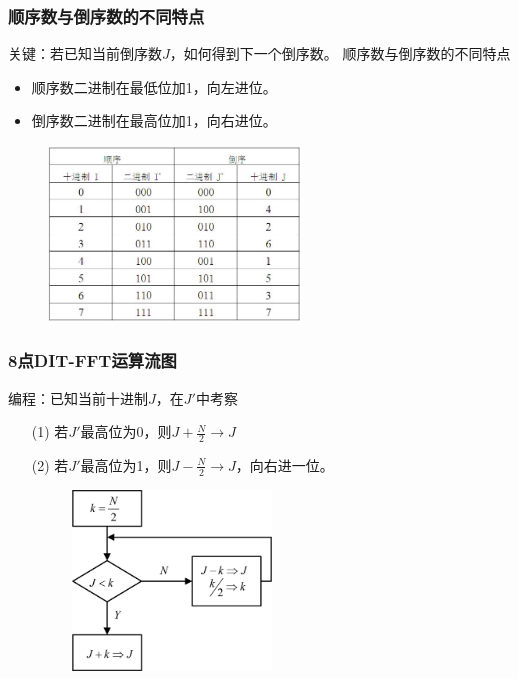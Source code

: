 \documentclass[notheorems,compress,mathserif,table]{beamer}
\begin{document}
\begin{frame}[shrink]\frametitle{顺序数与倒序数的不同特点}%
关键：若已知当前倒序数$J$，如何得到下一个倒序数。
顺序数与倒序数的不同特点
\begin{itemize}
  \item 顺序数二进制在最低位加1，向左进位。
  \item 倒序数二进制在最高位加1，向右进位。
\end{itemize}
\begin{figure}[h]
  \centering
  \includegraphics[width=0.6\textwidth]{daoxun.jpg}
\end{figure}
\end{frame}
\begin{frame}[shrink]\frametitle{8点DIT-FFT运算流图}%
编程：已知当前十进制$J$，在$J'$中考察
\begin{enumerate}
  \item [(1)]若$J'$最高位为0，则$J+\frac{N}{2}\longrightarrow J$
            \newline

  \item [(2)]若$J'$最高位为1，则$J-\frac{N}{2}\longrightarrow J$，向右进一位。
  \newline
    \begin{figure}[h]
    \centering
    \includegraphics[width=0.5\textwidth]{daoxubianchen.jpg}
    \end{figure}
\end{enumerate}
\end{frame}
\end{document}
